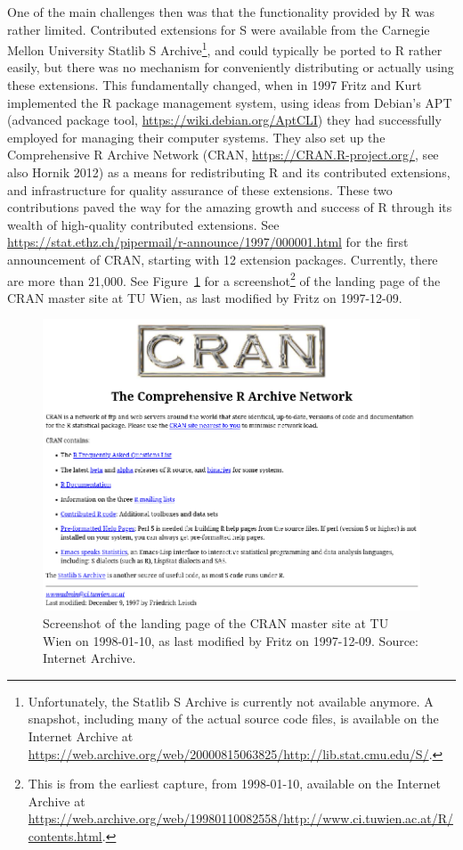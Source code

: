 One of the main challenges then was that the functionality provided by R
was rather limited. Contributed extensions for S were available from the
Carnegie Mellon University Statlib S Archive\footnote{Unfortunately, the Statlib
  S Archive is currently not available anymore. A snapshot, including many
  of the actual source code files, is available on the Internet Archive at
  \url{https://web.archive.org/web/20000815063825/http://lib.stat.cmu.edu/S/}.}, and could typically be
ported to R rather easily, but there was no mechanism for conveniently
distributing or actually using these extensions. This fundamentally
changed, when in 1997 Fritz and Kurt implemented the R package
management system, using ideas from Debian's APT (advanced package tool,
\url{https://wiki.debian.org/AptCLI}) they had successfully employed for
managing their computer systems. They also set up the Comprehensive R
Archive Network (CRAN, \url{https://CRAN.R-project.org/}, see also Hornik 2012) as a means for redistributing R and its contributed
extensions, and infrastructure for quality assurance of these
extensions. These two contributions paved the way for the amazing
growth and success of R through its wealth of high-quality contributed
extensions.
See \url{https://stat.ethz.ch/pipermail/r-announce/1997/000001.html} for
the first announcement of CRAN, starting with 12 extension packages.
Currently, there are more than 21,000. See Figure~\ref{fig:cran}
for a screenshot\footnote{This is from the earliest capture, from 1998-01-10,
  available on the Internet Archive at
  \url{https://web.archive.org/web/19980110082558/http://www.ci.tuwien.ac.at/R/contents.html}.}
of the landing page of the CRAN master site at TU Wien, as last modified
by Fritz on 1997-12-09.

\begin{figure}[t!]

{\centering \includegraphics[width=1\linewidth]{fritz_files/figure-latex/cran-1} 

}

\caption{Screenshot of the landing page of the CRAN master site at TU Wien on 1998-01-10, as last modified by Fritz on 1997-12-09. Source: Internet Archive.}\label{fig:cran}
\end{figure}

